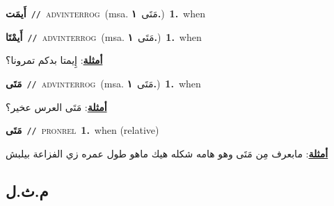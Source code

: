 \documentclass[10pt,a4paper,twoside]{article} %
\begin{document}
\begin{multicols}{2}
{{{{{{{{{{{{\setlength\topsep{0pt}\textbf{\foreignlanguage{arabic}{أَيمَت}}\ {\color{gray}\texttt{//}\color{black}}\ \textsc{adv\textunderscore interrog}\ \color{gray}(msa. \foreignlanguage{arabic}{مَتَى}~\foreignlanguage{arabic}{\textbf{١.}})\color{black}\ \textbf{1.}~when\ 

{\setlength\topsep{0pt}\textbf{\foreignlanguage{arabic}{أَيمْتَا}}\ {\color{gray}\texttt{//}\color{black}}\ \textsc{adv\textunderscore interrog}\ \color{gray}(msa. \foreignlanguage{arabic}{مَتَى}~\foreignlanguage{arabic}{\textbf{١.}})\color{black}\ \textbf{1.}~when\  \begin{flushright}\color{gray}\foreignlanguage{arabic}{\textbf{\underline{\foreignlanguage{arabic}{أمثلة}}}: إِيمتا بدكم تمرونا؟}\end{flushright}\color{black}} \vspace{2mm}

{\setlength\topsep{0pt}\textbf{\foreignlanguage{arabic}{مَتَى}}\ {\color{gray}\texttt{//}\color{black}}\ \textsc{adv\textunderscore interrog}\ \color{gray}(msa. \foreignlanguage{arabic}{مَتَى}~\foreignlanguage{arabic}{\textbf{١.}})\color{black}\ \textbf{1.}~when\  \begin{flushright}\color{gray}\foreignlanguage{arabic}{\textbf{\underline{\foreignlanguage{arabic}{أمثلة}}}: مَتَى العرس عخير؟}\end{flushright}\color{black}} \vspace{2mm}

{\setlength\topsep{0pt}\textbf{\foreignlanguage{arabic}{مَتَى}}\ {\color{gray}\texttt{//}\color{black}}\ \textsc{pron\textunderscore rel}\ \textbf{1.}~when (relative)\  \begin{flushright}\color{gray}\foreignlanguage{arabic}{\textbf{\underline{\foreignlanguage{arabic}{أمثلة}}}: مابعرف مِن مَتَى وهو هامه شكله هيك ماهو طول عمره زي الفزاعة بيلبش}\end{flushright}\color{black}} \vspace{2mm}

\vspace{-3mm}
\subsection*{\color{blue}\foreignlanguage{arabic}{م.ث.ل}\color{blue}{}} 

}}}}}}}}}}}}
\end{multicols}
\end{document}
